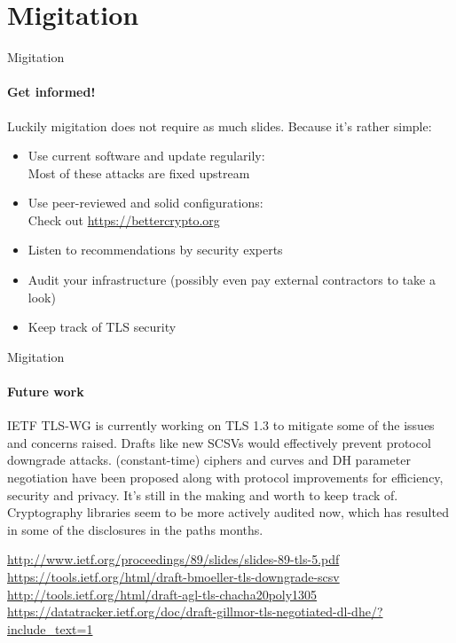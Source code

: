\documentclass[hyperref={draft}]{beamer}
\begin{document}
\section{Migitation}

\begin{frame}{Migitation}
  \framesubtitle{Get informed!}
  Luckily migitation does not require as much slides. Because it's rather simple:
  \begin{itemize}
    \item Use current software and update regularily:\\
      Most of these attacks are fixed upstream
    \item Use peer-reviewed and solid configurations:\\
      Check out \url{https://bettercrypto.org}
    \item Listen to recommendations by security experts
    \item Audit your infrastructure (possibly even pay external contractors to take a look)
    \item Keep track of TLS security
  \end{itemize}
\end{frame}

\begin{frame}{Migitation}
  \framesubtitle{Future work}
  IETF TLS-WG is currently working on TLS 1.3 to mitigate some of the issues and concerns raised. 
  \newline
  \newline
  Drafts like new SCSVs would effectively prevent protocol downgrade attacks. (constant-time) ciphers and curves and DH parameter negotiation have been proposed along with protocol improvements for efficiency, security and privacy. It's still in the making and worth to keep track of.
  \newline
  \newline
  Cryptography libraries seem to be more actively audited now, which has resulted in some of the disclosures in the paths months.

  \vspace{15px}

  \tiny
  \url{http://www.ietf.org/proceedings/89/slides/slides-89-tls-5.pdf}\\
  \url{https://tools.ietf.org/html/draft-bmoeller-tls-downgrade-scsv}\\
  \url{http://tools.ietf.org/html/draft-agl-tls-chacha20poly1305}\\
  \url{https://datatracker.ietf.org/doc/draft-gillmor-tls-negotiated-dl-dhe/?include_text=1}\\
\end{frame}
\end{document}
